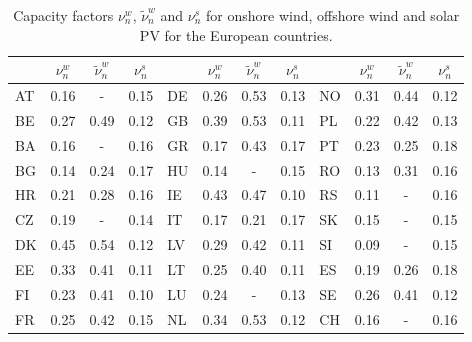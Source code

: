 \begin{table}[h!]
\caption{Capacity factors $\nu_n^w$, $\tilde{\nu}_n^w$ and  $\nu_n^s$ for onshore wind, offshore wind and solar PV for the European countries.}
\label{tab:capacity-factors}
\begin{adjustbox}{center}
\begin{tabular}{lccclccclccc}  \toprule
 & $\nu_n^w$ & $\tilde{\nu}_n^w$ & $\nu_n^s$ &  & $\nu_n^w$ & $\tilde{\nu}_n^w$ & $\nu_n^s$ &  & $\nu_n^w$ & $\tilde{\nu}_n^w$ & $\nu_n^s$\\ \midrule
AT & 0.16 & - & 0.15 & DE & 0.26 & 0.53 & 0.13 & NO & 0.31 & 0.44 & 0.12\\
BE & 0.27 & 0.49 & 0.12 & GB & 0.39 & 0.53 & 0.11 & PL & 0.22 & 0.42 & 0.13\\
BA & 0.16 & - & 0.16 & GR & 0.17 & 0.43 & 0.17 & PT & 0.23 & 0.25 & 0.18\\
BG & 0.14 & 0.24 & 0.17 & HU & 0.14 & - & 0.15 & RO & 0.13 & 0.31 & 0.16\\
HR & 0.21 & 0.28 & 0.16 & IE & 0.43 & 0.47 & 0.10 & RS & 0.11 & - & 0.16\\
CZ & 0.19 & - & 0.14 & IT & 0.17 & 0.21 & 0.17 & SK & 0.15 & - & 0.15\\
DK & 0.45 & 0.54 & 0.12 & LV & 0.29 & 0.42 & 0.11 & SI & 0.09 & - & 0.15\\
EE & 0.33 & 0.41 & 0.11 & LT & 0.25 & 0.40 & 0.11 & ES & 0.19 & 0.26 & 0.18\\
FI & 0.23 & 0.41 & 0.10 & LU & 0.24 & - & 0.13 & SE & 0.26 & 0.41 & 0.12\\
FR & 0.25 & 0.42 & 0.15 & NL & 0.34 & 0.53 & 0.12 & CH & 0.16 & - & 0.16\\ \bottomrule
\end{tabular}
\end{adjustbox}
\end{table}
